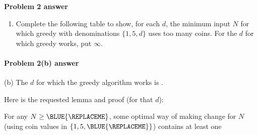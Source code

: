 \textbf{Problem 2 answer} 

\begin{enumerate}

\item[(a)]   Complete the following table to show,  for each $d$,
  the minimum input $N$ for which greedy with denominations $\{1,5,d\}$
  uses too many coins.  For the $d$ for which greedy works, put $\infty$.


\end{enumerate}

\continued

\paragraph{Problem 2(b) answer} 

\medskip

\noindent (b) The $d$ for which the greedy algorithm works is .

\medskip

Here is the requested lemma and proof (for that $d$):


\begin{lemma}
  For any \(N\ge
  \BLUE{
    \REPLACEME              %
  }
  \),
  some optimal way of making change for $N$
  (using coin values in \(\{1, 5,
  \BLUE{
    \REPLACEME              %
  }
  \}\))
  contains at least one \BLUE{
    \(
    \REPLACEME              %
    \)
  }
\end{lemma}


